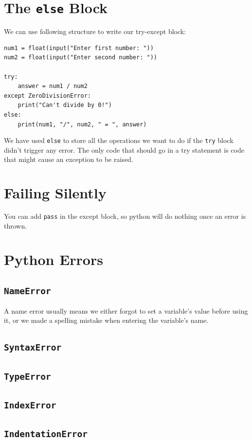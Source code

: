 \documentclass[12pt]{book}
\begin{document}
\section{The \texttt{else} Block}
\label{sec:org0e702ab}
We can use following structure to write our try-except block:
\begin{verbatim}
num1 = float(input("Enter first number: "))
num2 = float(input("Enter second number: "))

try:
    answer = num1 / num2
except ZeroDivisionError:
    print("Can't divide by 0!")
else:
    print(num1, "/", num2, " = ", answer)
\end{verbatim}
We have used \texttt{else} to store all the operations we want to do if the \texttt{try} block didn't trigger any error. The only code that should go in a try statement is code that might cause an exception to be raised.
\section{Failing Silently}
\label{sec:org08e5386}
You can add \texttt{pass} in the except block, so python will do nothing once an error is thrown.
\section{Python Errors}
\label{sec:orge2d0231}
\subsection{\texttt{NameError}}
\label{sec:orgf1f9e2f}
A name error usually means we either forgot to set a variable’s value before using it, or we made a spelling mistake when entering the variable’s name.
\subsection{\texttt{SyntaxError}}
\label{sec:orgca3ad88}
\subsection{\texttt{TypeError}}
\label{sec:org33fc6fc}
\subsection{\texttt{IndexError}}
\label{sec:org627d004}
\subsection{\texttt{IndentationError}}
\label{sec:org68f653b}
\end{document}
